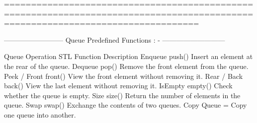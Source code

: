 ================================================================================================================================

--------------------------
Queue Predefined Functions    : - 
---------------------------

Queue Operation	                          STL Function	                                               Description
Enqueue	push()	Insert an element at the rear of the queue.
Dequeue	pop()	Remove the front element from the queue.
Peek / Front	front()	View the front element without removing it.
Rear / Back	back()	View the last element without removing it.
IsEmpty	empty()	Check whether the queue is empty.
Size	size()	Return the number of elements in the queue.
Swap	swap()	Exchange the contents of two queues.
Copy Queue	=	Copy one queue into another.
